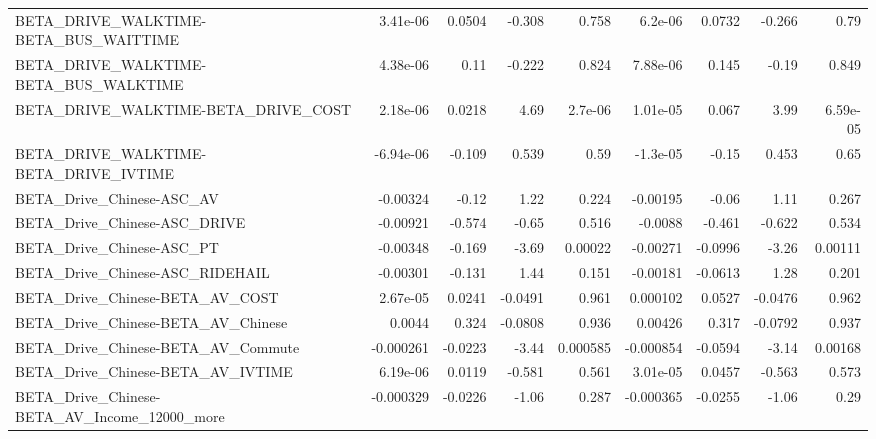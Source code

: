 \begin{tabular}{lrrrrrrrr}
BETA\_DRIVE\_WALKTIME-BETA\_BUS\_WAITTIME              &    3.41e-06 &       0.0504 &   -0.308 &    0.758 &    6.2e-06 &      0.0732 &       -0.266 &          0.79 \\
BETA\_DRIVE\_WALKTIME-BETA\_BUS\_WALKTIME              &    4.38e-06 &         0.11 &   -0.222 &    0.824 &   7.88e-06 &       0.145 &        -0.19 &         0.849 \\
BETA\_DRIVE\_WALKTIME-BETA\_DRIVE\_COST                &    2.18e-06 &       0.0218 &     4.69 &  2.7e-06 &   1.01e-05 &       0.067 &         3.99 &      6.59e-05 \\
BETA\_DRIVE\_WALKTIME-BETA\_DRIVE\_IVTIME              &   -6.94e-06 &       -0.109 &    0.539 &     0.59 &   -1.3e-05 &       -0.15 &        0.453 &          0.65 \\
BETA\_Drive\_Chinese-ASC\_AV                          &    -0.00324 &        -0.12 &     1.22 &    0.224 &   -0.00195 &       -0.06 &         1.11 &         0.267 \\
BETA\_Drive\_Chinese-ASC\_DRIVE                       &    -0.00921 &       -0.574 &    -0.65 &    0.516 &    -0.0088 &      -0.461 &       -0.622 &         0.534 \\
BETA\_Drive\_Chinese-ASC\_PT                          &    -0.00348 &       -0.169 &    -3.69 &  0.00022 &   -0.00271 &     -0.0996 &        -3.26 &       0.00111 \\
BETA\_Drive\_Chinese-ASC\_RIDEHAIL                    &    -0.00301 &       -0.131 &     1.44 &    0.151 &   -0.00181 &     -0.0613 &         1.28 &         0.201 \\
BETA\_Drive\_Chinese-BETA\_AV\_COST                    &    2.67e-05 &       0.0241 &  -0.0491 &    0.961 &   0.000102 &      0.0527 &      -0.0476 &         0.962 \\
BETA\_Drive\_Chinese-BETA\_AV\_Chinese                 &      0.0044 &        0.324 &  -0.0808 &    0.936 &    0.00426 &       0.317 &      -0.0792 &         0.937 \\
BETA\_Drive\_Chinese-BETA\_AV\_Commute                 &   -0.000261 &      -0.0223 &    -3.44 & 0.000585 &  -0.000854 &     -0.0594 &        -3.14 &       0.00168 \\
BETA\_Drive\_Chinese-BETA\_AV\_IVTIME                  &    6.19e-06 &       0.0119 &   -0.581 &    0.561 &   3.01e-05 &      0.0457 &       -0.563 &         0.573 \\
BETA\_Drive\_Chinese-BETA\_AV\_Income\_12000\_more       &   -0.000329 &      -0.0226 &    -1.06 &    0.287 &  -0.000365 &     -0.0255 &        -1.06 &          0.29 \\

\end{tabular}
